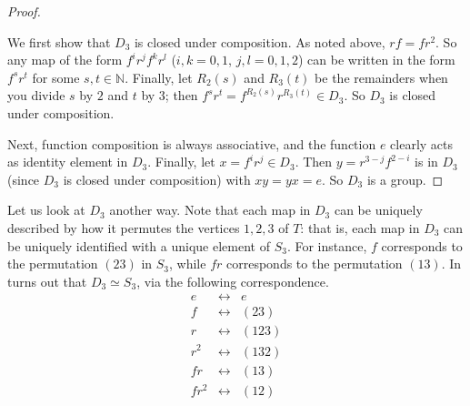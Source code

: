 \documentclass[10pt,]{book}
\theoremstyle{plain}
\theoremstyle{definition}
\theoremstyle{definition}
\theoremstyle{definition}
\theoremstyle{definition}
\numberwithin{equation}{section}
\def\N{\mathbb{N}}
\newcommand{\amp}{ & }
\begin{document}
\begin{proof}\hypertarget{proof-31}{}

        We first show that \(D_3\) is closed under composition. As
        noted above, \(rf=fr^2\). So any map of the form \(f^ir^jf^kr^l\)
        (\(i,k=0,1\), \(j,l=0,1,2\)) can be written in the form \(f^sr^t\)
        for some \(s,t \in \N\). Finally, let \(R_2(s)\) and \(R_3(t)\) be
        the remainders when you divide \(s\) by \(2\) and \(t\) by \(3\); then
        \(f^sr^t=f^{R_2(s)}r^{R_3(t)} \in D_3\). So \(D_3\) is closed under
        composition.
\par

        Next, function composition is always associative, and the function \(e\) clearly acts as identity
              element
              in \(D_3\).
         Finally, let \(x=f^ir^j\in D_3\). Then \(y=r^{3-j}f^{2-i}\)
              is
              in \(D_3\) (since \(D_3\) is closed under composition) with \(xy=yx=e\). So \(D_3\) is a group.
\end{proof}
\par

      Let us look at \(D_3\) another way. Note that each map in \(D_3\) can be uniquely described by how it permutes the vertices \(1,2,3\) of \(T\): that is, each map in \(D_3\) can be uniquely identified with a unique element of \(S_3\). For instance, \(f\) corresponds to the permutation \((23)\) in \(S_3\), while \(fr\) corresponds to the permutation \((13)\). In turns out that \(D_3 \simeq S_3\), via the following correspondence.
\begin{equation*}

        \begin{array}{ccl}
        e \amp \leftrightarrow \amp  e\\
        f \amp \leftrightarrow \amp  (23)\\
        r \amp \leftrightarrow \amp  (123)\\
        r^2 \amp \leftrightarrow \amp  (132)\\
        fr \amp \leftrightarrow \amp  (13)\\
        fr^2 \amp \leftrightarrow \amp  (12)
        \end{array}
      
\end{equation*}

\par
\end{document}
